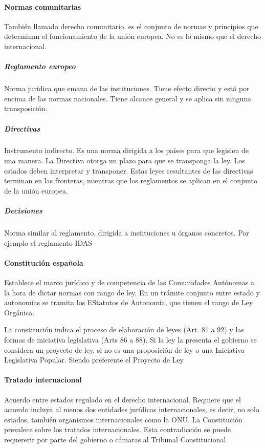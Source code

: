     \paragraph{Normas comunitarias}
        También llamado derecho comunitario. es el conjunto de normas y principios que determinan el funcionamiento de la unión europea. No es lo mismo que el derecho internacional.

        \subparagraph{Reglamento europeo}
            Norma jurídica que emana de las instituciones. Tiene efecto directo y está por encima de las normas nacionales. Tiene alcance general y se aplica sin ninguna transposición.

        \subparagraph{Directivas}
            Instrumento indirecto. Es una norma dirigida a los países para que legislen de una manera. La Directiva otorga un plazo para que se transponga la ley. Los estados deben interpretar y transponer. Estas leyes resultantes de las directivas terminan en las fronteras, mientras que los reglamentos se aplican en el conjunto de la unión europea.

        \subparagraph{Decisiones}
            Norma similar al reglamento, dirigida a instituciones u órganos concretos. Por ejemplo el reglamento IDAS

    \paragraph{Constitución española}
        Establece el marco jurídico y de competencia de las Comunidades Autónomas a la hora de dictar normas con rango de ley. En un trámite conjunto entre estado y autonomías se tramita los EStatutos de Autonomía, que tienen el rango de Ley Orgánica.

        La constitución indica el proceso de elaboración de leyes (Art. 81 a 92) y las formas de iniciativa legislativa (Arts 86 a 88). Si la ley la presenta el gobierno se considera un proyecto de ley, si no es una proposición de ley o una Iniciativa Legislativa Popular. Siendo preferente el Proyecto de Ley

    \paragraph{Tratado internacional}
        Acuerdo entre estados regulado en el derecho internacional. Requiere que el acuerdo incluya al menos dos entidades jurídicas internacionales, es decir, no solo estados, también organismos internacionales como la ONU. La Constitución prevalece sobre los tratados internacionales. Esta contradicción se puede requererir por parte del gobierno o cámaras al Tribunal Constitucional.

